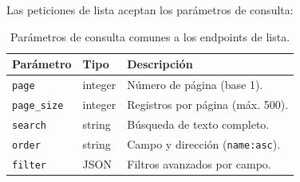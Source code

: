 Las peticiones de lista aceptan los parámetros de consulta:

\begin{table}[H]
  \centering
  \caption{Parámetros de consulta comunes a los endpoints de lista.}
  \label{tab:params-lista}
  \begin{tabular}{llp{7cm}}
    \toprule
    \textbf{Parámetro} & \textbf{Tipo} & \textbf{Descripción} \\
    \midrule
    \texttt{page}      & integer & Número de página (base 1). \\
    \texttt{page\_size} & integer & Registros por página (máx. 500). \\
    \texttt{search}    & string  & Búsqueda de texto completo. \\
    \texttt{order}     & string  & Campo y dirección (\texttt{name:asc}). \\
    \texttt{filter}    & JSON    & Filtros avanzados por campo. \\
    \bottomrule
  \end{tabular}
\end{table}
